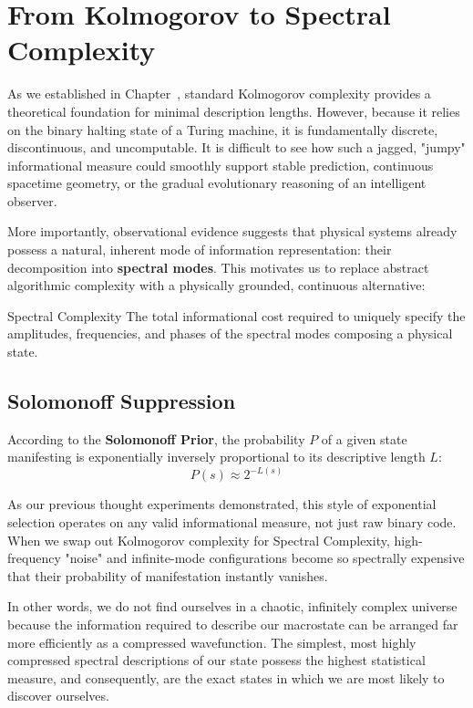 \section{From Kolmogorov to Spectral Complexity}

As we established in Chapter~, standard Kolmogorov complexity provides a theoretical foundation for minimal description lengths.
However, because it relies on the binary halting state of a Turing machine, it is fundamentally discrete, discontinuous, and uncomputable.
It is difficult to see how such a jagged, "jumpy" informational measure could smoothly support stable prediction, continuous spacetime geometry, or the gradual evolutionary reasoning of an intelligent observer.

More importantly, observational evidence suggests that physical systems already possess a natural, inherent mode of information representation: their decomposition into \textbf{spectral modes}.
This motivates us to replace abstract algorithmic complexity with a physically grounded, continuous alternative:

\begin{definition}{Spectral Complexity}
The total informational cost required to uniquely specify the amplitudes, frequencies, and phases of the spectral modes composing a physical state.
\end{definition}

\subsection*{Solomonoff Suppression}

According to the \textbf{Solomonoff Prior}, the probability $P$ of a given state manifesting is exponentially inversely proportional to its descriptive length $L$:
\[
P(s) \approx 2^{-L(s)}
\]

As our previous thought experiments demonstrated, this style of exponential selection operates on any valid informational measure, not just raw binary code.
When we swap out Kolmogorov complexity for Spectral Complexity, high-frequency "noise" and infinite-mode configurations become so spectrally expensive that their probability of manifestation instantly vanishes. 

In other words, we do not find ourselves in a chaotic, infinitely complex universe because the information required to describe our macrostate can be arranged far more efficiently as a compressed wavefunction.
The simplest, most highly compressed spectral descriptions of our state possess the highest statistical measure, and consequently, are the exact states in which we are most likely to discover ourselves.

